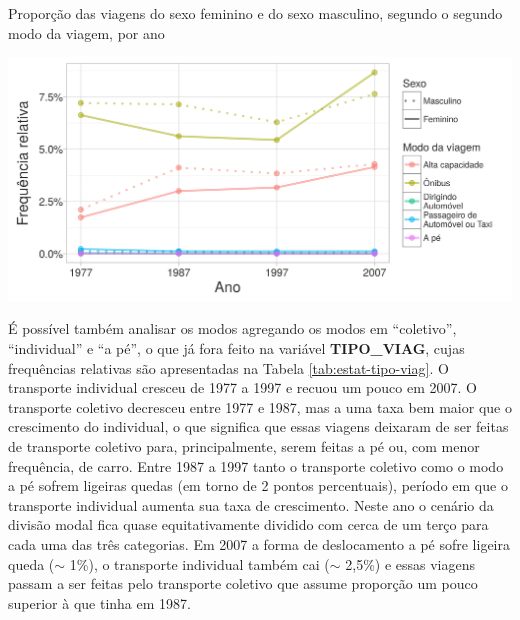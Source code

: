 \begin{grafico}[htb]%
    \caption{\label{graf:freq-modo2}Proporção das viagens do sexo feminino e do sexo masculino, segundo o segundo modo da viagem, por ano}%
    \begin{center}%
        \includegraphics[width=1\textwidth]{./imagens/freq-modo2.png}%
    \end{center}%
\end{grafico}%

\clearpage

É possível também analisar os modos agregando os modos em ``coletivo'', ``individual'' e ``a pé'', o que já fora feito na variável \textbf{TIPO_VIAG}, cujas frequências relativas são apresentadas na Tabela \ref{tab:estat-tipo-viag}.
O transporte individual cresceu de 1977 a 1997 e recuou um pouco em 2007.
O transporte coletivo decresceu entre 1977 e 1987, mas a uma taxa bem maior que o crescimento do individual, o que significa que essas viagens deixaram de ser feitas de transporte coletivo para, principalmente, serem feitas a pé ou, com menor frequência, de carro.
Entre 1987 a 1997 tanto o transporte coletivo como o modo a pé sofrem ligeiras quedas (em torno de 2 pontos percentuais), período em que o transporte individual aumenta sua taxa de crescimento. Neste ano o cenário da divisão modal fica quase equitativamente dividido com cerca de um terço para cada uma das três categorias.
Em 2007 a forma de deslocamento a pé sofre ligeira queda ($\sim$ 1\%), o transporte individual também cai ($\sim$ 2,5\%) e essas viagens passam a ser feitas pelo transporte coletivo que assume proporção um pouco superior à que tinha em 1987.

